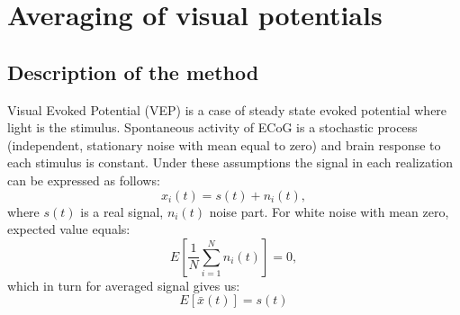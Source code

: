 \documentclass{pracalicmgr}
\begin{document}
   \section{Averaging of visual potentials}
   
   \subsection{Description of the method}
   Visual Evoked Potential (VEP) is a case of steady state evoked potential where light is the stimulus. Spontaneous activity of ECoG is a stochastic process (independent, stationary noise with mean equal to zero) and brain response to each stimulus is constant. 
   Under these assumptions the signal in each realization can be expressed as follows:
   \begin{equation}
   x_i(t) = s(t) + n_i(t),
   \end{equation}
   where $s(t)$ is a real signal, $n_i(t)$ noise part. For white noise with mean zero, expected value equals:
   \begin{equation}
   E\left[ \frac{1}{N}\sum_{i=1}^{N} n_i(t)\right] = 0, 
   \end{equation}
   which in turn for averaged signal gives us:
   \begin{equation}
   E\left[ \bar{x}(t) \right] = s(t)
   \end{equation}
   
\end{document}
